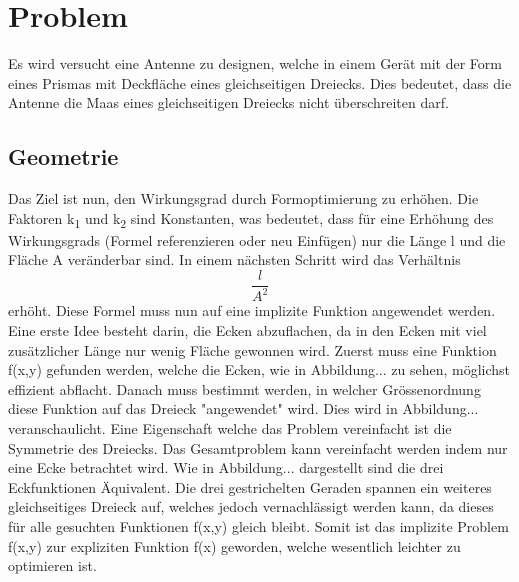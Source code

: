 %
%
% 
%
%

\section{Problem\label{antennen:problemstellung}}
 Es wird versucht eine Antenne zu designen, welche in einem Gerät mit der Form eines Prismas mit Deckfläche eines gleichseitigen Dreiecks. Dies bedeutet, dass die Antenne die Maas eines gleichseitigen Dreiecks nicht überschreiten darf.
\subsection{Geometrie\label{antennen:Geom}}
Das Ziel ist nun, den Wirkungsgrad durch Formoptimierung zu erhöhen. Die Faktoren k\textsubscript{1} und k\textsubscript{2} sind Konstanten, was bedeutet, dass für eine Erhöhung des Wirkungsgrads (Formel referenzieren oder neu Einfügen) nur die Länge l und die Fläche A veränderbar sind. In einem nächsten Schritt wird das Verhältnis
\begin{equation}
	\frac{l}{A^2}
	\label{antennen:Verhältnis}
\end{equation}
erhöht. Diese Formel muss nun auf eine implizite Funktion angewendet werden. Eine erste Idee besteht darin, die Ecken abzuflachen, da in den Ecken mit viel zusätzlicher Länge nur wenig Fläche gewonnen wird. Zuerst muss eine Funktion f(x,y) gefunden werden, welche die Ecken, wie in Abbildung... zu sehen, möglichst effizient abflacht. Danach muss bestimmt werden, in welcher Grössenordnung diese Funktion auf das Dreieck "angewendet" wird. Dies wird in Abbildung... veranschaulicht.
Eine Eigenschaft welche das Problem vereinfacht ist die Symmetrie des Dreiecks. Das Gesamtproblem kann vereinfacht werden indem nur eine Ecke betrachtet wird. Wie in Abbildung... dargestellt sind die drei Eckfunktionen Äquivalent. Die drei gestrichelten Geraden spannen ein weiteres gleichseitiges Dreieck auf, welches jedoch vernachlässigt werden kann, da dieses für alle gesuchten Funktionen f(x,y) gleich bleibt. Somit ist das implizite Problem f(x,y) zur expliziten Funktion f(x) geworden, welche wesentlich leichter zu optimieren ist.